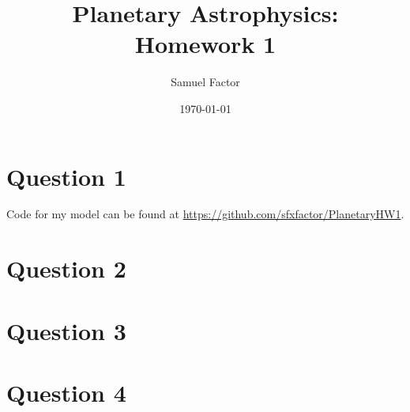 \documentclass[12pt]{article}
\title{Planetary Astrophysics: \\ Homework 1}
\author{Samuel Factor}
\date{\today}                                           %
\begin{document}
\maketitle
\section{Question 1}
Code for my model can be found at \url{https://github.com/sfxfactor/PlanetaryHW1}. 
\section{Question 2}
\section{Question 3}
\section{Question 4}
\end{document}
